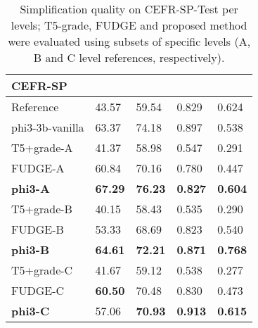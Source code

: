 \begin{table}[t!]
    \small
    \centering
   \begin{adjustbox}{width=1\linewidth}
    \begin{tabular}{l L L L L} \hline
    \textbf{CEFR-SP} &   &    &    &      \\ \hline
     Reference & 43.57 &  59.54 & 0.829 & 0.624 \\ 
      phi3-3b-vanilla  & 63.37 & 74.18 & 0.897 & 0.538 \\ \hline
      
       T5+grade-A & 41.37 & 58.98 & 0.547 &0.291 \\
       
    FUDGE-A & 60.84 & 70.16 & 0.780 & 0.447 \\
    
    \textbf{phi3-A} & \textbf{67.29} & \textbf{76.23} & \textbf{0.827} & \textbf{0.604} \\ \hline
    
       T5+grade-B & 40.15 & 58.43 & 0.535 &0.290 \\
    FUDGE-B & 53.33 & 68.69 & 0.823 & 0.540 \\
    \textbf{phi3-B} & \textbf{64.61} & \textbf{72.21} & \textbf{0.871} & \textbf{0.768} \\ \hline

    
      T5+grade-C & 41.67 & 59.12 & 0.538 &0.277 \\
      
       FUDGE-C & \textbf{60.50} & 70.48 & 0.830 & 0.473 \\
       
        \textbf{phi3-C} & 57.06 & \textbf{70.93} & \textbf{0.913} &\textbf{0.615} \\
         \hline
    \end{tabular}
   \end{adjustbox}
    \caption{Simplification quality on CEFR-SP-Test per levels; T5-grade, FUDGE and proposed method were evaluated using subsets of specific levels (A, B and C level references, respectively).}
    \label{tab:cefr2}
\end{table}


